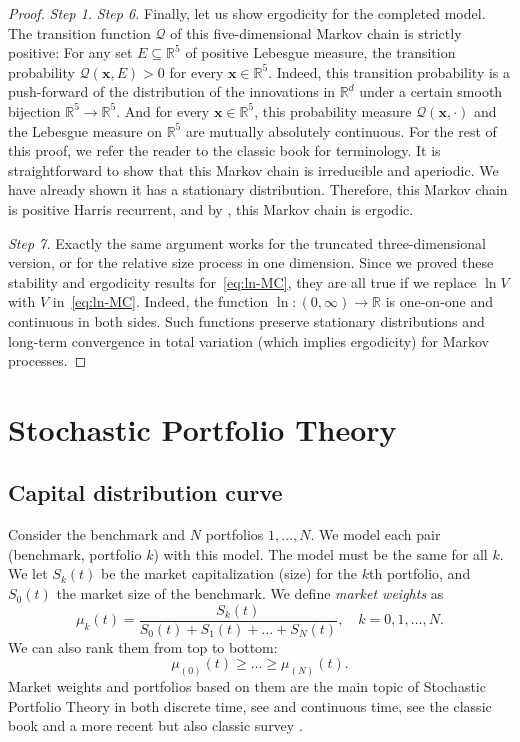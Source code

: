 \documentclass[12pt]{amsart}
\begin{document}
\begin{proof} {\it Step 1.}
{\it Step 6.} Finally, let us show ergodicity for the completed model. The transition function $\mathcal Q$ of this five-dimensional Markov chain is strictly positive: For any set $E \subseteq \mathbb R^5$ of positive Lebesgue measure, the transition probability $\mathcal Q(\mathbf{x}, E) > 0$ for every $\mathbf{x} \in \mathbb R^5$. Indeed, this transition probability is a push-forward of the distribution of the innovations in $\mathbb R^d$ under a certain smooth bijection $\mathbb R^5 \to \mathbb R^5$. And for every $\mathbf{x} \in \mathbb R^5$, this probability measure $\mathcal Q(\mathbf{x}, \cdot)$ and the Lebesgue measure on $\mathbb R^5$ are mutually absolutely continuous. For the rest of this proof, we refer the reader to the classic book \cite{MT-book} for terminology. It is straightforward to show that this Markov chain is irreducible and aperiodic. We have already shown it has a stationary distribution. Therefore, this Markov chain is positive Harris recurrent, and by \cite[Theorem 13.0.1]{MT-book}, this Markov chain is ergodic. 

{\it Step 7.} Exactly the same argument works for the truncated three-dimensional version, or for the relative size process in one dimension. Since we proved these stability and ergodicity results for~\eqref{eq:ln-MC}, they are all true if we replace $\ln V$ with $V$ in~\eqref{eq:ln-MC}. Indeed, the function $\ln : (0, \infty) \to \mathbb R$ is one-on-one and continuous in both sides. Such functions preserve stationary distributions and long-term convergence in total variation (which implies ergodicity) for Markov processes. 
\end{proof}


\section{Stochastic Portfolio Theory}

\subsection{Capital distribution curve} Consider the benchmark and $N$ portfolios $1, \ldots, N$. We model each pair (benchmark, portfolio $k$) with this model. The model must be the same for all $k$. We let $S_k(t)$ be the market capitalization (size) for the $k$th portfolio, and $S_0(t)$ the market size of the benchmark. We define {\it market weights} as 
\begin{equation}
\label{eq:market-weights}
\mu_{k}(t) = \frac{S_k(t)}{S_0(t) + S_1(t) + \ldots + S_N(t)},\quad k = 0, 1, \ldots, N.
\end{equation}
We can also rank them from top to bottom:
\begin{equation}
\label{eq:ranked-market-weights}
\mu_{(0)}(t) \ge \ldots \ge \mu_{(N)}(t).
\end{equation}
Market weights and portfolios based on them are the main topic of Stochastic Portfolio Theory in both discrete time, see \cite{Wong2, Wong1} and continuous time, see the classic book \cite{FernholzBook} and a more recent but also classic survey \cite{FKSurvey}. 
\end{document}
